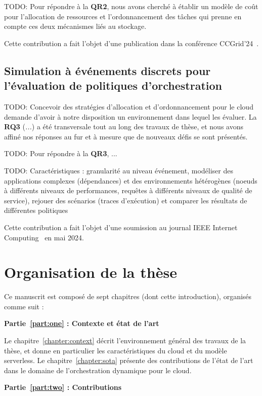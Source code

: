 TODO: Pour répondre à la \textbf{QR2}, nous avons cherché à établir un modèle de coût pour l'allocation de ressources et l'ordonnancement des tâches qui prenne en compte ces deux mécanismes liés au stockage.

Cette contribution a fait l'objet d'une publication dans la conférence CCGrid'24~\cite{herocache}.

\subsection{Simulation à événements discrets pour l'évaluation de politiques d'orchestration}

TODO: Concevoir des stratégies d'allocation et d'ordonnancement pour le cloud demande d'avoir à notre disposition un environnement dans lequel les évaluer. La \textbf{RQ3} (\textit{...}) a été transversale tout au long des travaux de thèse, et nous avons affiné nos réponses au fur et à mesure que de nouveaux défis se sont présentés.

TODO: Pour répondre à la \textbf{QR3}, ...

TODO: Caractéristiques : granularité au niveau événement, modéliser des applications complexes (dépendances) et des environnements hétérogènes (noeuds à différents niveaux de performances, requêtes à différents niveaux de qualité de service), rejouer des scénarios (traces d'exécution) et comparer les résultats de différentes politiques

Cette contribution a fait l'objet d'une soumission au journal IEEE Internet Computing~\cite{herosim} en mai 2024.

\section{Organisation de la thèse}

Ce manuscrit est composé de sept chapitres (dont cette introduction), organisés comme suit :

\textbf{Partie~\ref{part:one} : Contexte et état de l'art}

Le chapitre~\ref{chapter:context} décrit l'environnement général des travaux de la thèse, et donne en particulier les caractéristiques du cloud et du modèle serverless. Le chapitre~\ref{chapter:sota} présente des contributions de l'état de l'art dans le domaine de l'orchestration dynamique pour le cloud.

\textbf{Partie~\ref{part:two} : Contributions}

